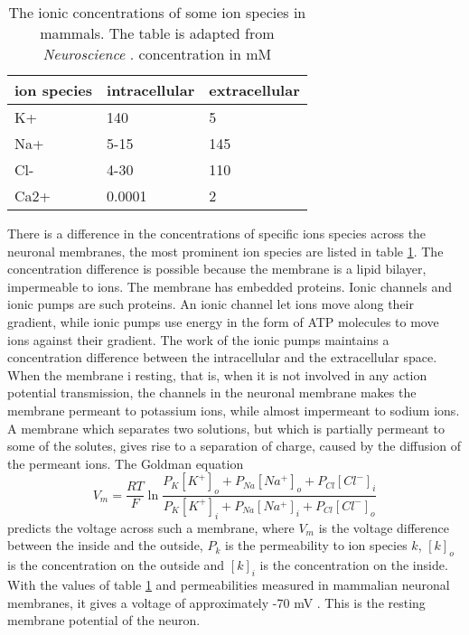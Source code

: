 \documentclass{article}
\begin{document}
\begin{table}[h!]
  \centering
  \caption{The ionic concentrations of some ion species in mammals. The table is adapted from \textit{Neuroscience} \cite{Neuroscience}. concentration in mM}
  \label{tab:ionic_concentrations}
  \begin{tabular}{l||l|l}
ion species & intracellular & extracellular \\
\hline
K+ & 140 & 5  \\
Na+ & 5-15 & 145 \\
Cl- & 4-30 & 110 \\
Ca2+ & 0.0001 & 2  \\
 \end{tabular}
\end{table}

There is a difference in the concentrations of specific ions species across the neuronal membranes, the most prominent ion species are listed in table \ref{tab:ionic_concentrations}.
The concentration difference is possible because the membrane is a lipid bilayer, impermeable to ions. The membrane has embedded proteins. Ionic channels and ionic pumps are such proteins. An ionic channel let ions move along their gradient, while ionic pumps use energy in the form of ATP molecules to move ions against their gradient. The work of the ionic pumps maintains a concentration difference between the intracellular and the extracellular space. When the membrane i resting, that is, when it is not involved in any action potential transmission, the channels in the neuronal membrane makes the membrane permeant to potassium ions, while almost impermeant to sodium ions. A membrane which separates two solutions, but which is partially permeant to some of the solutes, gives rise to a separation of charge, caused by the diffusion of the permeant ions.  The Goldman equation 
\begin{equation}\label{eq:goldman}
V_m = \frac{RT}{F}\ln \frac{P_K[K^+]_o + P_{Na}[Na^+]_o + P_{Cl}[Cl^-]_{i}}{P_K[K^+]_i + P_{Na}[Na^+]_i + P_{Cl}[Cl^-]_{o}}
\end{equation}
predicts the voltage across such a membrane, where $V_m$ is the voltage difference between the inside and the outside, $P_k$ is the permeability to ion species $k$, $[k]_o$ is the concentration on the outside and $[k]_i$ is the concentration on the inside. With the values of table \ref{tab:ionic_concentrations} and permeabilities measured in mammalian neuronal membranes, it gives a voltage of approximately -70 mV \cite{Neuroscience}. This is the resting membrane potential of the neuron. 
\end{document}

